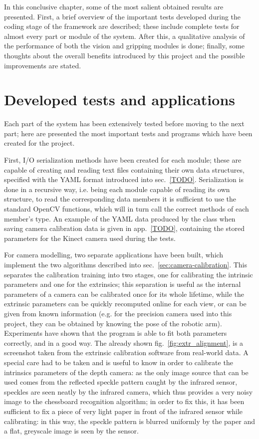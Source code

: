 In this conclusive chapter, some of the most salient obtained results
are presented. First, a brief overview of the important tests
developed during the coding stage of the framework are described;
these include complete tests for almost every part or module of the
system. After this, a qualitative analysis of the performance of both
the vision and gripping modules is done; finally, some thoughts about
the overall benefits introduced by this project and the possible
improvements are stated. 

\section{Developed tests and applications}
Each part of the system has been extensively tested before moving to
the next part; here are presented the most important tests and
programs which have been created for the project. 

First, I/O serialization methods have been created for each module;
these are capable of creating and reading text files containing their
own data structures, specified with the YAML format introduced into
sec.~\ref{TODO}. Serialization is done in a recursive way, i.e. being
each module capable of reading its own structure, to read the
corresponding data members it is sufficient to use the standard OpenCV
functions, which will in turn call the correct methods of each
member's type. An example of the YAML data produced by
the  class when saving camera calibration data is given in
app.~\ref{TODO}, containing the stored parameters for the Kinect
camera used during the tests. 

For camera modelling, two separate applications have been built, which
implement the two algorithms described into
sec.~\ref{sec:camera-calibration}. This separates the calibration
training into two stages, one for calibrating the intrinsic parameters
and one for the extrinsics; this separation is useful as the internal
parameters of a camera can be calibrated once for its whole lifetime,
while the  extrinsic parameters can be quickly recomputed online for
each view, or can be given from known information (e.g. for the
precision camera used into this project, they can be obtained by
knowing the pose of the robotic arm). Experiments have shown that the
program is able to fit both parameters correctly, and in a good
way. The already shown fig.~\ref{fig:extr_alignment}, is a screenshot
taken from the extrinsic calibration software from real-world data. A
special care had to be taken and is useful to know in order to
calibrate the intrinsics parameters of the depth camera: as the only
image source that can be used comes from the reflected speckle pattern
caught by the infrared sensor, speckles are seen neatly by the
infrared camera, which thus provides a very noisy image to the
chessboard recognition algorithm; in order to fix this, it has been
sufficient to fix a piece of very light paper in front of the infrared
sensor while calibrating: in this way, the speckle pattern is blurred
uniformly by the paper and a flat, greyscale image is seen by the sensor.

